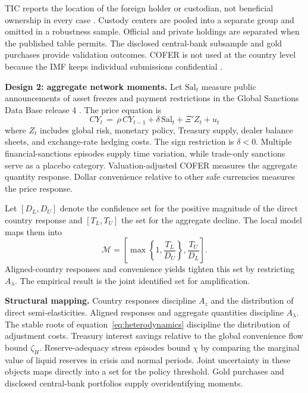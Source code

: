 \documentclass[11pt]{article}
\theoremstyle{definition}
\begin{document}
TIC reports the location of the foreign holder or custodian, not beneficial ownership in every case \citep{USTreasuryTIC}. Custody centers are pooled into a separate group and omitted in a robustness sample. Official and private holdings are separated when the published table permits. The disclosed central-bank subsample and gold purchases provide validation outcomes. COFER is not used at the country level because the IMF keeps individual submissions confidential \citep{IMFCOFER}.

\medskip
\noindent\textbf{Design 2: aggregate network moments.} Let $\mathrm{Sal}_t$ measure public announcements of asset freezes and payment restrictions in the Global Sanctions Data Base release 4 \citep{GSDBRelease4}. The price equation is
\begin{equation}
CY_t \,=\, \rho\, CY_{t-1} + \delta\, \mathrm{Sal}_t + \Xi' Z_t + u_t
\label{eq:cyreg}
\end{equation}
where $Z_t$ includes global risk, monetary policy, Treasury supply, dealer balance sheets, and exchange-rate hedging costs. The sign restriction is $\delta<0$. Multiple financial-sanctions episodes supply time variation, while trade-only sanctions serve as a placebo category. Valuation-adjusted COFER measures the aggregate quantity response. Dollar convenience relative to other safe currencies measures the price response.

Let $[D_L,D_U]$ denote the confidence set for the positive magnitude of the direct country response and $[T_L,T_U]$ the set for the aggregate decline. The local model maps them into
\begin{equation}
\mathcal M=
\left[
\max\left\{1,\frac{T_L}{D_U}\right\},
\frac{T_U}{D_L}
\right].
\label{eq:identifiedset}
\end{equation}
Aligned-country responses and convenience yields tighten this set by restricting $A_\lambda$. The empirical result is the joint identified set for amplification.

\medskip
\noindent\textbf{Structural mapping.} Country responses discipline $A_z$ and the distribution of direct semi-elasticities. Aligned responses and aggregate quantities discipline $A_\lambda$. The stable roots of equation~\eqref{eq:heterodynamics} discipline the distribution of adjustment costs. Treasury interest savings relative to the global convenience flow bound $\zeta_H$. Reserve-adequacy stress episodes bound $\chi$ by comparing the marginal value of liquid reserves in crisis and normal periods. Joint uncertainty in these objects maps directly into a set for the policy threshold. Gold purchases and disclosed central-bank portfolios supply overidentifying moments.
\end{document}
